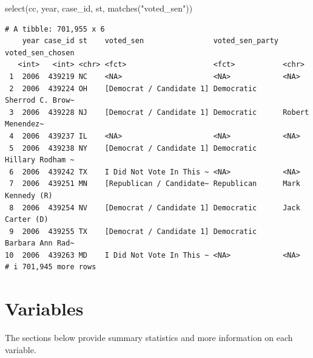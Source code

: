 \documentclass[10pt,article,oneside]{memoir}
\newenvironment{Shaded}{\begin{snugshade}}{\end{snugshade}}
\newcommand{\FunctionTok}[1]{\textcolor[rgb]{0.28,0.35,0.67}{#1}}
\newcommand{\NormalTok}[1]{\textcolor[rgb]{0.00,0.23,0.31}{#1}}
\newcommand{\StringTok}[1]{\textcolor[rgb]{0.13,0.47,0.30}{#1}}
\begin{document}
\begin{Shaded}
\begin{Highlighting}[]
\FunctionTok{select}\NormalTok{(cc, year, case\_id, st, }\FunctionTok{matches}\NormalTok{(}\StringTok{"voted\_sen"}\NormalTok{))}
\end{Highlighting}
\end{Shaded}

\begin{verbatim}
# A tibble: 701,955 x 6
    year case_id st    voted_sen                voted_sen_party voted_sen_chosen
   <int>   <int> <chr> <fct>                    <fct>           <chr>           
 1  2006  439219 NC    <NA>                     <NA>            <NA>            
 2  2006  439224 OH    [Democrat / Candidate 1] Democratic      Sherrod C. Brow~
 3  2006  439228 NJ    [Democrat / Candidate 1] Democratic      Robert Menendez~
 4  2006  439237 IL    <NA>                     <NA>            <NA>            
 5  2006  439238 NY    [Democrat / Candidate 1] Democratic      Hillary Rodham ~
 6  2006  439242 TX    I Did Not Vote In This ~ <NA>            <NA>            
 7  2006  439251 MN    [Republican / Candidate~ Republican      Mark Kennedy (R)
 8  2006  439254 NV    [Democrat / Candidate 1] Democratic      Jack Carter (D) 
 9  2006  439255 TX    [Democrat / Candidate 1] Democratic      Barbara Ann Rad~
10  2006  439263 MD    I Did Not Vote In This ~ <NA>            <NA>            
# i 701,945 more rows
\end{verbatim}

\section{Variables}\label{variables}

The sections below provide summary statistics and more information on
each variable.
\end{document}

